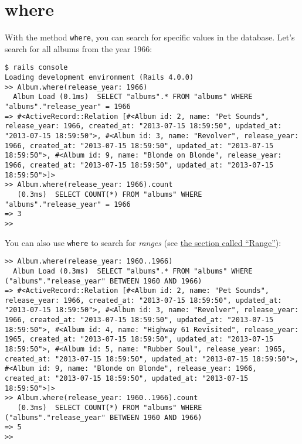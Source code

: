 \documentclass[a4paper]{book}
\newcounter{tab}[chapter]
\begin{document}
\section{where}\label{where}

With the method \texttt{where}, you can search for specific values in the database. Let's search for all albums from the year 1966:

\begin{shaded}\begin{verbatim}
$ rails console
Loading development environment (Rails 4.0.0)
>> Album.where(release_year: 1966)
  Album Load (0.1ms)  SELECT "albums".* FROM "albums" WHERE "albums"."release_year" = 1966
=> #<ActiveRecord::Relation [#<Album id: 2, name: "Pet Sounds", release_year: 1966, created_at: "2013-07-15 18:59:50", updated_at: "2013-07-15 18:59:50">, #<Album id: 3, name: "Revolver", release_year: 1966, created_at: "2013-07-15 18:59:50", updated_at: "2013-07-15 18:59:50">, #<Album id: 9, name: "Blonde on Blonde", release_year: 1966, created_at: "2013-07-15 18:59:50", updated_at: "2013-07-15 18:59:50">]>
>> Album.where(release_year: 1966).count
   (0.3ms)  SELECT COUNT(*) FROM "albums" WHERE "albums"."release_year" = 1966
=> 3
>>
\end{verbatim}\end{shaded}

You can also use \texttt{where} to search for \emph{ranges} (see \hyperref[rangeux5fclass]{the section called “Range”}):

\begin{shaded}\begin{verbatim}
>> Album.where(release_year: 1960..1966)
  Album Load (0.3ms)  SELECT "albums".* FROM "albums" WHERE ("albums"."release_year" BETWEEN 1960 AND 1966)
=> #<ActiveRecord::Relation [#<Album id: 2, name: "Pet Sounds", release_year: 1966, created_at: "2013-07-15 18:59:50", updated_at: "2013-07-15 18:59:50">, #<Album id: 3, name: "Revolver", release_year: 1966, created_at: "2013-07-15 18:59:50", updated_at: "2013-07-15 18:59:50">, #<Album id: 4, name: "Highway 61 Revisited", release_year: 1965, created_at: "2013-07-15 18:59:50", updated_at: "2013-07-15 18:59:50">, #<Album id: 5, name: "Rubber Soul", release_year: 1965, created_at: "2013-07-15 18:59:50", updated_at: "2013-07-15 18:59:50">, #<Album id: 9, name: "Blonde on Blonde", release_year: 1966, created_at: "2013-07-15 18:59:50", updated_at: "2013-07-15 18:59:50">]>
>> Album.where(release_year: 1960..1966).count
   (0.3ms)  SELECT COUNT(*) FROM "albums" WHERE ("albums"."release_year" BETWEEN 1960 AND 1966)
=> 5
>>
\end{verbatim}\end{shaded}
\end{document}
